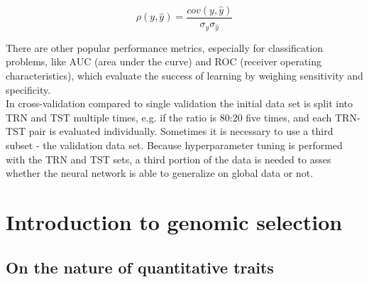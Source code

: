 \begin{equation}
  \rho(y,\hat{y}) = \frac{cov(y,\hat{y})}{ \sigma_y \sigma_{\hat{y}}}
 \label{eqn:pearson}
\end{equation}

There are other popular performance metrics, especially for classification problems, like
AUC (area under the curve) and ROC (receiver operating characteristics), which evaluate
the success of learning by weighing sensitivity and specificity. \\
In cross-validation compared to single validation the initial data set is split into TRN
and TST multiple times, e.g. if the ratio is 80:20 five times, and each TRN-TST pair is
evaluated individually. Sometimes it is necessary to use a third subset - the validation
data set. Because hyperparameter tuning is performed with the TRN and TST sets, a third
portion of the data is needed to asses whether the neural network is able to generalize on
global data or not.

 

\newpage
\section{Introduction to genomic selection} \label{chap:gs}
\subsection{On the nature of quantitative traits} \label{quan}

